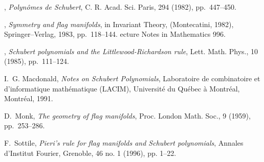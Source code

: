 \begin{thebibliography}{10}
\leavevmode\vrule height 2pt depth -1.6pt width 23pt, {\em Polyn{\^o}mes de
  {S}chubert}, C. R. Acad. Sci. Paris, 294 (1982), pp.~447--450.

\leavevmode\vrule height 2pt depth -1.6pt width 23pt, {\em Symmetry and flag
  manifolds}, in Invariant Theory, ({M}ontecatini, 1982), Springer--Verlag,
  1983, pp.~118--144.
ecture {N}otes in {M}athematics 996.

\leavevmode\vrule height 2pt depth -1.6pt width 23pt, {\em {S}chubert
  polynomials and the {L}ittlewood-{R}ichardson rule}, Lett. Math. Phys., 10
  (1985), pp.~111--124.

{\sc I.~G. Macdonald}, {\em Notes on {S}chubert Polynomials}, Laboratoire de
  combinatoire et d'informatique math\'ematique {(LACIM)}, Universit\'e du
  Qu\'ebec \`a Montr\'eal, Montr\'eal, 1991.

{\sc D.~Monk}, {\em The geometry of flag manifolds}, Proc. London Math. Soc., 9
  (1959), pp.~253--286.

{\sc F.~Sottile}, {\em {P}ieri's rule for flag manifolds and 
Schubert polynomials},
\newblock Annales d'Institut Fourier, Grenoble, 46 no. 1 (1996), pp. 1--22.

\end{thebibliography}




